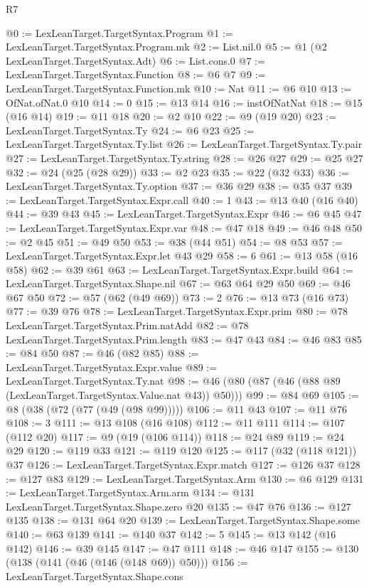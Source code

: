 \begin{lexlean}{R7}
\begin{coremodule}
{{{{{{{{{{{{{{{{{{{{@0 := LexLeanTarget.TargetSyntax.Program
@1 := LexLeanTarget.TargetSyntax.Program.mk
@2 := List.nil.{0}
@5 := @1 (@2 LexLeanTarget.TargetSyntax.Adt)
@6 := List.cons.{0}
@7 := LexLeanTarget.TargetSyntax.Function
@8 := @6 @7
@9 := LexLeanTarget.TargetSyntax.Function.mk
@10 := Nat
@11 := @6 @10
@13 := OfNat.ofNat.{0} @10
@14 := 0
@15 := @13 @14
@16 := instOfNatNat
@18 := @15 (@16 @14)
@19 := @11 @18
@20 := @2 @10
@22 := @9 (@19 @20)
@23 := LexLeanTarget.TargetSyntax.Ty
@24 := @6 @23
@25 := LexLeanTarget.TargetSyntax.Ty.list
@26 := LexLeanTarget.TargetSyntax.Ty.pair
@27 := LexLeanTarget.TargetSyntax.Ty.string
@28 := @26 @27
@29 := @25 @27
@32 := @24 (@25 (@28 @29))
@33 := @2 @23
@35 := @22 (@32 @33)
@36 := LexLeanTarget.TargetSyntax.Ty.option
@37 := @36 @29
@38 := @35 @37
@39 := LexLeanTarget.TargetSyntax.Expr.call
@40 := 1
@43 := @13 @40 (@16 @40)
@44 := @39 @43
@45 := LexLeanTarget.TargetSyntax.Expr
@46 := @6 @45
@47 := LexLeanTarget.TargetSyntax.Expr.var
@48 := @47 @18
@49 := @46 @48
@50 := @2 @45
@51 := @49 @50
@53 := @38 (@44 @51)
@54 := @8 @53
@57 := LexLeanTarget.TargetSyntax.Expr.let @43 @29
@58 := 6
@61 := @13 @58 (@16 @58)
@62 := @39 @61
@63 := LexLeanTarget.TargetSyntax.Expr.build
@64 := LexLeanTarget.TargetSyntax.Shape.nil
@67 := @63 @64 @29 @50
@69 := @46 @67 @50
@72 := @57 (@62 (@49 @69))
@73 := 2
@76 := @13 @73 (@16 @73)
@77 := @39 @76
@78 := LexLeanTarget.TargetSyntax.Expr.prim
@80 := @78 LexLeanTarget.TargetSyntax.Prim.natAdd
@82 := @78 LexLeanTarget.TargetSyntax.Prim.length
@83 := @47 @43
@84 := @46 @83
@85 := @84 @50
@87 := @46 (@82 @85)
@88 := LexLeanTarget.TargetSyntax.Expr.value
@89 := LexLeanTarget.TargetSyntax.Ty.nat
@98 := @46 (@80 (@87 (@46 (@88 @89 (LexLeanTarget.TargetSyntax.Value.nat @43)) @50)))
@99 := @84 @69
@105 := @8 (@38 (@72 (@77 (@49 (@98 @99)))))
@106 := @11 @43
@107 := @11 @76
@108 := 3
@111 := @13 @108 (@16 @108)
@112 := @11 @111
@114 := @107 (@112 @20)
@117 := @9 (@19 (@106 @114))
@118 := @24 @89
@119 := @24 @29
@120 := @119 @33
@121 := @119 @120
@125 := @117 (@32 (@118 @121)) @37
@126 := LexLeanTarget.TargetSyntax.Expr.match
@127 := @126 @37
@128 := @127 @83
@129 := LexLeanTarget.TargetSyntax.Arm
@130 := @6 @129
@131 := LexLeanTarget.TargetSyntax.Arm.arm
@134 := @131 LexLeanTarget.TargetSyntax.Shape.zero @20
@135 := @47 @76
@136 := @127 @135
@138 := @131 @64 @20
@139 := LexLeanTarget.TargetSyntax.Shape.some
@140 := @63 @139
@141 := @140 @37
@142 := 5
@145 := @13 @142 (@16 @142)
@146 := @39 @145
@147 := @47 @111
@148 := @46 @147
@155 := @130 (@138 (@141 (@46 (@146 (@148 @69)) @50)))
@156 := LexLeanTarget.TargetSyntax.Shape.cons
}}}}}}}}}}}}}}}}}}}}
\end{coremodule}
\end{lexlean}
